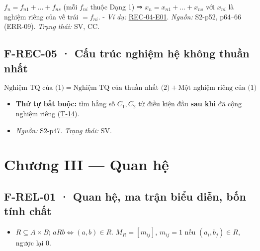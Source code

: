 \documentclass[
  10pt,
  twoside,openany]{book}
\providecommand{\tightlist}{%
  \setlength{\itemsep}{0pt}\setlength{\parskip}{0pt}}
\begin{document}
\(f_n=f_{n1}+\dots+f_{ns}\) (mỗi \(f_{ni}\) thuộc Dạng 1) ⇒
\(x_n=x_{n1}+\dots+x_{ns}\) với \(x_{ni}\) là nghiệm riêng của vế trái
\(=f_{ni}\). - \emph{Ví dụ:} \protect\hyperlink{REC-04-E01}{REC-04-E01}.
\emph{Nguồn:} S2-p52, p64--66 (ERR-09). \emph{Trạng thái:} SV, CC.

\hypertarget{F-REC-05}{%
\subsection{F-REC-05 · Cấu trúc nghiệm hệ không thuần
nhất}\label{F-REC-05}}

\[
\text{Nghiệm TQ của (1)}=\text{Nghiệm TQ của thuần nhất (2)}+\text{Một nghiệm riêng của (1)}
\]

\begin{itemize}
\tightlist
\item
  \textbf{Thứ tự bắt buộc:} tìm hằng số \(C_1,C_2\) từ điều kiện đầu
  \textbf{sau khi} đã cộng nghiệm riêng
  (\protect\hyperlink{T-14}{T-14}).
\item
  \emph{Nguồn:} S2-p47. \emph{Trạng thái:} SV.
\end{itemize}

\hypertarget{chux1b0ux1a1ng-iii-quan-hux1ec7-1}{%
\section{Chương III --- Quan
hệ}\label{chux1b0ux1a1ng-iii-quan-hux1ec7-1}}

\hypertarget{F-REL-01}{%
\subsection{F-REL-01 · Quan hệ, ma trận biểu diễn, bốn tính
chất}\label{F-REL-01}}

\begin{itemize}
\tightlist
\item
  \(R\subseteq A\times B\); \(aRb\Leftrightarrow(a,b)\in R\).
  \(M_R=[m_{ij}]\), \(m_{ij}=1\) nếu \((a_i,b_j)\in R\), ngược lại 0.
\end{itemize}
\end{document}
